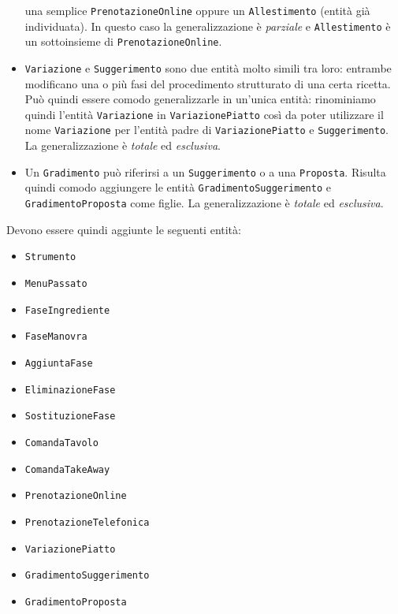 \begin{itemize}
    una semplice {\tt PrenotazioneOnline} oppure un {\tt Allestimento} (entità già individuata).
    In questo caso la generalizzazione è {\it parziale} e {\tt Allestimento}
    è un sottoinsieme di {\tt PrenotazioneOnline}.
\item {\tt Variazione} e {\tt Suggerimento} sono due entità molto simili tra loro: entrambe
    modificano una o più fasi del procedimento strutturato di una certa ricetta. Può quindi
    essere comodo generalizzarle in un'unica entità: rinominiamo quindi l'entità {\tt Variazione}
    in {\tt VariazionePiatto} così da poter utilizzare il nome {\tt Variazione} per l'entità
    padre di {\tt VariazionePiatto} e {\tt Suggerimento}. La generalizzazione è {\it totale}
    ed {\it esclusiva}.
\item Un {\tt Gradimento} può riferirsi a un {\tt Suggerimento} o a una {\tt Proposta}.
    Risulta quindi comodo aggiungere le entità {\tt GradimentoSuggerimento} e
    {\tt GradimentoProposta} come figlie. La generalizzazione è {\it totale} ed
    {\it esclusiva}.
\end{itemize}

Devono essere quindi aggiunte le seguenti entità:
\begin{multicols}{2}
\begin{itemize}
    \item\tt Strumento
    \item\tt MenuPassato
    \item\tt FaseIngrediente
    \item\tt FaseManovra
    \item\tt AggiuntaFase
    \item\tt EliminazioneFase
    \item\tt SostituzioneFase
    \item\tt ComandaTavolo
    \item\tt ComandaTakeAway
    \item\tt PrenotazioneOnline
    \item\tt PrenotazioneTelefonica
    \item\tt VariazionePiatto
    \item\tt GradimentoSuggerimento
    \item\tt GradimentoProposta
\end{itemize}
\end{multicols}
